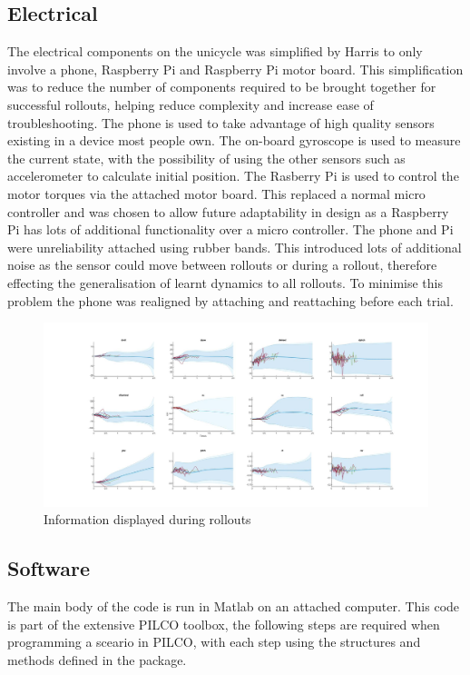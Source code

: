 \documentclass[twoside,twocolumn,12pt]{article}
\begin{document}
\subsection{Electrical}
The electrical components on the unicycle was simplified by Harris \cite{arsalan} to only involve a phone, Raspberry Pi and Raspberry Pi motor board. This simplification was to reduce the number of components required to be brought together for successful rollouts, helping reduce complexity and increase ease of troubleshooting. 
\newline
The phone is used to take advantage of high quality sensors existing in a device most people own. The on-board gyroscope is used to measure the current state, with the possibility of using the other sensors such as accelerometer to calculate initial position. 
\newline
The Rasberry Pi is used to control the motor torques via the attached motor board. This replaced a normal micro controller and was chosen to allow future adaptability in design as a Raspberry Pi has lots of additional functionality over a micro controller.
\newline
The phone and Pi were unreliability attached using rubber bands. This introduced lots of additional noise as the sensor could move between rollouts or during a rollout, therefore effecting the generalisation of learnt dynamics to all rollouts. To minimise this problem the phone was realigned by attaching and reattaching before each trial. 
\begin{figure}[t!]
  \centering
    \includegraphics[width=\linewidth]{pilco1}
   \caption{Information displayed during rollouts}
  \label{fig:pilcoscreen}
\end{figure}
\subsection{Software}
The main body of the code is run in Matlab on an attached computer. This code is part of the extensive PILCO toolbox, the following steps are required when programming a sceario in PILCO, with each step using the structures and methods defined in the package.
\end{document}
